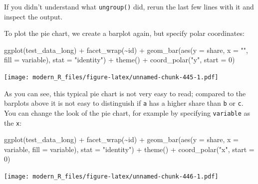 \documentclass[
]{article}
\newenvironment{Shaded}{\begin{snugshade}}{\end{snugshade}}
\newcommand{\AttributeTok}[1]{\textcolor[rgb]{0.77,0.63,0.00}{#1}}
\newcommand{\DecValTok}[1]{\textcolor[rgb]{0.00,0.00,0.81}{#1}}
\newcommand{\FunctionTok}[1]{\textcolor[rgb]{0.00,0.00,0.00}{#1}}
\newcommand{\NormalTok}[1]{#1}
\newcommand{\SpecialCharTok}[1]{\textcolor[rgb]{0.00,0.00,0.00}{#1}}
\newcommand{\StringTok}[1]{\textcolor[rgb]{0.31,0.60,0.02}{#1}}
\begin{document}
If you didn't understand what \texttt{ungroup()} did, rerun the last few lines with it and inspect the
output.

To plot the pie chart, we create a barplot again, but specify polar coordinates:

\begin{Shaded}
\begin{Highlighting}[]
\FunctionTok{ggplot}\NormalTok{(test\_data\_long) }\SpecialCharTok{+}
  \FunctionTok{facet\_wrap}\NormalTok{(}\SpecialCharTok{\textasciitilde{}}\NormalTok{id) }\SpecialCharTok{+}
  \FunctionTok{geom\_bar}\NormalTok{(}\FunctionTok{aes}\NormalTok{(}\AttributeTok{y =}\NormalTok{ share, }\AttributeTok{x =} \StringTok{""}\NormalTok{, }\AttributeTok{fill =}\NormalTok{ variable), }\AttributeTok{stat =} \StringTok{"identity"}\NormalTok{) }\SpecialCharTok{+}
  \FunctionTok{theme}\NormalTok{() }\SpecialCharTok{+}
  \FunctionTok{coord\_polar}\NormalTok{(}\StringTok{"y"}\NormalTok{, }\AttributeTok{start =} \DecValTok{0}\NormalTok{)}
\end{Highlighting}
\end{Shaded}

\texttt{[image: modern\_R\_files/figure-latex/unnamed-chunk-445-1.pdf]}

As you can see, this typical pie chart is not very easy to read; compared to the barplots above it
is not easy to distinguish if \texttt{a} has a higher share than \texttt{b} or \texttt{c}. You can change the look of the
pie chart, for example by specifying \texttt{variable} as the \texttt{x}:

\begin{Shaded}
\begin{Highlighting}[]
\FunctionTok{ggplot}\NormalTok{(test\_data\_long) }\SpecialCharTok{+}
  \FunctionTok{facet\_wrap}\NormalTok{(}\SpecialCharTok{\textasciitilde{}}\NormalTok{id) }\SpecialCharTok{+}
  \FunctionTok{geom\_bar}\NormalTok{(}\FunctionTok{aes}\NormalTok{(}\AttributeTok{y =}\NormalTok{ share, }\AttributeTok{x =}\NormalTok{ variable, }\AttributeTok{fill =}\NormalTok{ variable), }\AttributeTok{stat =} \StringTok{"identity"}\NormalTok{) }\SpecialCharTok{+}
  \FunctionTok{theme}\NormalTok{() }\SpecialCharTok{+}
  \FunctionTok{coord\_polar}\NormalTok{(}\StringTok{"x"}\NormalTok{, }\AttributeTok{start =} \DecValTok{0}\NormalTok{)}
\end{Highlighting}
\end{Shaded}

\texttt{[image: modern\_R\_files/figure-latex/unnamed-chunk-446-1.pdf]}
\end{document}

